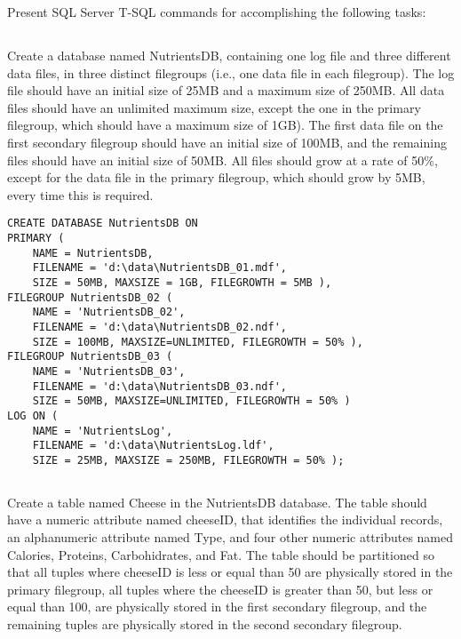 	{\color{gray}Present SQL Server T-SQL commands for accomplishing the following tasks:}
	\subsection{}
	{\color{gray}Create a database named NutrientsDB, containing one log file and three different data files, in three distinct filegroups (i.e., one data file in each filegroup). The log file should have an initial size of 25MB and a maximum size of 250MB. All data files should have an unlimited maximum size, except the one in the primary filegroup, which should have a maximum size of 1GB). The first data file on the first secondary filegroup should have an initial size of 100MB, and the remaining files should have an initial size of 50MB. All files should grow at a rate of 50\%, except for the data file in the primary filegroup, which should grow by 5MB, every time this is required.}

\begin{lstlisting}
CREATE DATABASE NutrientsDB ON 
PRIMARY (
	NAME = NutrientsDB,
	FILENAME = 'd:\data\NutrientsDB_01.mdf',
	SIZE = 50MB, MAXSIZE = 1GB, FILEGROWTH = 5MB ),
FILEGROUP NutrientsDB_02 (
	NAME = 'NutrientsDB_02', 
	FILENAME = 'd:\data\NutrientsDB_02.ndf', 
	SIZE = 100MB, MAXSIZE=UNLIMITED, FILEGROWTH = 50% ),
FILEGROUP NutrientsDB_03 (
	NAME = 'NutrientsDB_03', 
	FILENAME = 'd:\data\NutrientsDB_03.ndf', 
	SIZE = 50MB, MAXSIZE=UNLIMITED, FILEGROWTH = 50% )
LOG ON (
	NAME = 'NutrientsLog',
	FILENAME = 'd:\data\NutrientsLog.ldf',
	SIZE = 25MB, MAXSIZE = 250MB, FILEGROWTH = 50% );
\end{lstlisting}
%

	\subsection{}
	{\color{gray}Create a table named Cheese in the NutrientsDB database. The table should have a numeric attribute named cheeseID, that identifies the individual records, an alphanumeric attribute named Type, and four other numeric attributes named Calories, Proteins, Carbohidrates, and Fat. The table should be partitioned so that all tuples where cheeseID is less or equal than 50 are physically stored in the primary filegroup, all tuples where the cheeseID is greater than 50, but less or equal than 100, are physically stored in the first secondary filegroup, and the remaining tuples are physically stored in the second secondary filegroup.}

